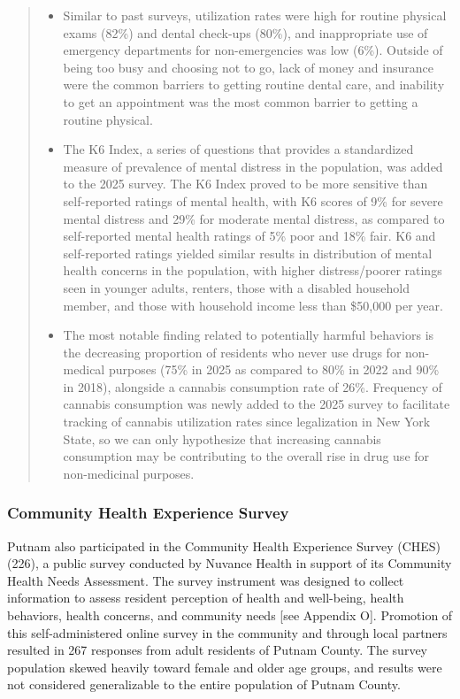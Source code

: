 \documentclass[
  english,
  letterpaper,
]{report}
\begin{document}
\begin{quote}
\begin{itemize}
  of household members with disabilities was more common (29\% of those
  with a disabled household member).
\item
  Similar to past surveys, utilization rates were high for routine
  physical exams (82\%) and dental check-ups (80\%), and inappropriate
  use of emergency departments for non-emergencies was low (6\%).
  Outside of being too busy and choosing not to go, lack of money and
  insurance were the common barriers to getting routine dental care, and
  inability to get an appointment was the most common barrier to getting
  a routine physical.
\item
  The K6 Index, a series of questions that provides a standardized
  measure of prevalence of mental distress in the population, was added
  to the 2025 survey. The K6 Index proved to be more sensitive than
  self-reported ratings of mental health, with K6 scores of 9\% for
  severe mental distress and 29\% for moderate mental distress, as
  compared to self-reported mental health ratings of 5\% poor and 18\%
  fair. K6 and self-reported ratings yielded similar results in
  distribution of mental health concerns in the population, with higher
  distress/poorer ratings seen in younger adults, renters, those with a
  disabled household member, and those with household income less than
  \$50,000 per year.
\item
  The most notable finding related to potentially harmful behaviors is
  the decreasing proportion of residents who never use drugs for
  non-medical purposes (75\% in 2025 as compared to 80\% in 2022 and
  90\% in 2018), alongside a cannabis consumption rate of 26\%.
  Frequency of cannabis consumption was newly added to the 2025 survey
  to facilitate tracking of cannabis utilization rates since
  legalization in New York State, so we can only hypothesize that
  increasing cannabis consumption may be contributing to the overall
  rise in drug use for non-medicinal purposes.
\end{itemize}
\end{quote}

\subsubsection{Community Health Experience
Survey}\label{community-health-experience-survey}

Putnam also participated in the Community Health Experience Survey
(CHES) (226), a public survey conducted by Nuvance Health in support of
its Community Health Needs Assessment. The survey instrument was
designed to collect information to assess resident perception of health
and well-being, health behaviors, health concerns, and community needs
{[}see Appendix O{]}. Promotion of this self-administered online survey
in the community and through local partners resulted in 267 responses
from adult residents of Putnam County. The survey population skewed
heavily toward female and older age groups, and results were not
considered generalizable to the entire population of Putnam County.
\end{document}
